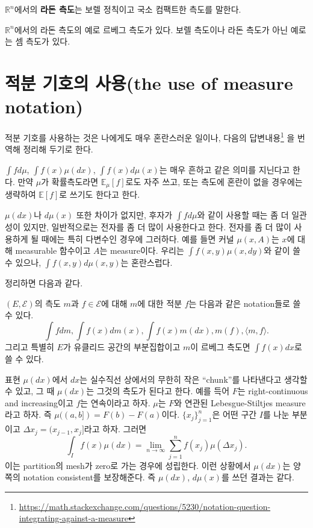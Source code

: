 \documentclass[b5paper,]{scrbook}
\theoremstyle{plain}
\theoremstyle{definition}
\numberwithin{equation}{section}
\renewcommand{\href}[2]{#2\footnote{\url{#1}}}
\let\BeginKnitrBlock\begin \let\EndKnitrBlock\end
\begin{document}
\BeginKnitrBlock{definition}[라돈 측도(Radon measure)]
\protect\hypertarget{def:unnamed-chunk-61}{}{\label{def:unnamed-chunk-61} {} }\(\mathbb{R}^{n}\)에서의 \textbf{라돈 측도}는 보렐 정칙이고 국소 컴팩트한 측도를 말한다.
\EndKnitrBlock{definition}

\(\mathbb{R}^{n}\)에서의 라돈 측도의 예로 르베그 측도가 있다. \citep{Pestman2009} 보렐 측도이나 라돈 측도가 아닌 예로는 셈 측도가 있다. \citep{Pestman2009}

\hypertarget{--the-use-of-measure-notation}{%
\section{적분 기호의 사용(the use of measure notation)}\label{--the-use-of-measure-notation}}

적분 기호를 사용하는 것은 나에게도 매우 혼란스러운 일이나, \href{https://math.stackexchange.com/questions/5230/notation-question-integrating-against-a-measure}{다음의 답변내용} 을 번역해 정리해 두기로 한다.

\(\int f d\mu\), \(\int f(x)\mu(dx)\), \(\int f(x) d\mu(x)\)는 매우 흔하고 같은 의미를 지닌다고 한다. 만약 \(\mu\)가 확률측도라면 \(\mathbb{E}_{\mu}[f]\)로도 자주 쓰고, 또는 측도에 혼란이 없을 경우에는 생략하여 \(\mathbb{E}[f]\)로 쓰기도 한다고 한다.

\(\mu(dx)\)나 \(d\mu(x)\) 또한 차이가 없지만, 후자가 \(\int f d\mu\)와 같이 사용할 때는 좀 더 일관성이 있지만, 일반적으로는 전자를 좀 더 많이 사용한다고 한다. 전자를 좀 더 많이 사용하게 될 때에는 특히 다변수인 경우에 그러하다. 예를 들면 커널 \(\mu(x,A)\)는 \(x\)에 대해 measurable 함수이고 \(A\)는 measure이다. 우리는 \(\int f(x,y)\mu(x,dy)\)와 같이 쓸 수 있으나, \(\int f(x,y)d\mu(x,y)\)는 혼란스럽다.

정리하면 다음과 같다.
\BeginKnitrBlock{definition}[다양한 측도 표현]
\protect\hypertarget{def:unnamed-chunk-62}{}{\label{def:unnamed-chunk-62} {} }\((E,\mathcal{E})\)의 측도 \(m\)과 \(f\in\mathcal{E}\)에 대해 \(m\)에 대한 적분 \(f\)는 다음과 같은 notation들로 쓸 수 있다.
\[\int f dm, \int f(x)dm(x), \int f(x)m(dx), m(f), \langle m, f \rangle.\]
그리고 특별히 \(E\)가 유클리드 공간의 부분집합이고 \(m\)이 르베그 측도면 \(\int f(x)dx\)로 쓸 수 있다.
\EndKnitrBlock{definition}

표현 \(\mu(dx)\)에서 \(dx\)는 실수직선 상에서의 무한히 작은 ``chunk''를 나타낸다고 생각할 수 있고, 그 때 \(\mu(dx)\)는 그것의 측도가 된다고 한다. 예를 득어 \(F\)는 right-continuous and increasing이고 \(f\)는 연속이라고 하자. \(\mu\)는 \(F\)와 연관된 Lebesgue-Stiltjes measure라고 하자. 즉 \(\mu((a,b])=F(b)-F(a)\)이다. \(\{x_{j} \}_{j=1}^{n}\)은 어떤 구간 \(I\)를 나눈 부분이고 \(\Delta x_{j}=(x_{j-1}, x_{j}]\)라고 하자. 그러면
\[\int_{I}f(x)\mu(dx)=\lim_{n\rightarrow\infty}\sum_{j=1}^{n}f(x_{j})\mu(\Delta x_{j}).\]
이는 partition의 mesh가 zero로 가는 경우에 성립한다. 이런 상황에서 \(\mu(dx)\)는 양쪽의 notation consistent를 보장해준다. 즉 \(\mu(dx)\), \(d\mu(x)\)를 쓰던 결과는 같다.
\end{document}
